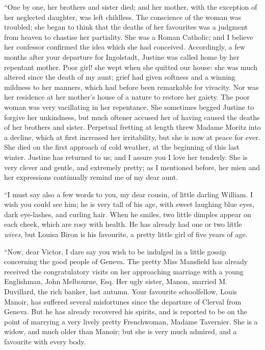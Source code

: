 ``One by one, her brothers and sister
died; and her mother, with the exception
of her neglected daughter, was left
childless. The conscience of the woman
was troubled; she began to think
that the deaths of her favourites was a
judgment from heaven to chastise her
partiality. She was a Roman Catholic;
and I believe her confessor confirmed
the idea which she had conceived. Accordingly,
a few months after your
departure for Ingolstadt, Justine was
called home by her repentant mother.
Poor girl! she wept when she quitted
our house: she was much altered since
the death of my aunt; grief had given
softness and a winning mildness to her
manners, which had before been remarkable
for vivacity. Nor was her
residence at her mother's house of a
nature to restore her gaiety. The poor
woman was very vacillating in her repentance.
She sometimes begged Justine
to forgive her unkindness, but
much oftener accused her of having
caused the deaths of her brothers and
sister. Perpetual fretting at length
threw Madame Moritz into a decline,
which at first increased her irritability,
but she is now at peace for ever. She
died on the first approach of cold weather,
at the beginning of this last winter.
Justine has returned to us; and I
assure you I love her tenderly. She is
very clever and gentle, and extremely
pretty; as I mentioned before, her mien
and her expressions continually remind
me of my dear aunt.

``I must say also a few words to you,
my dear cousin, of little darling William.
I wish you could see him; he is
very tall of his age, with sweet laughing
blue eyes, dark eye-lashes, and curling
hair. When he smiles, two little dimples
appear on each cheek, which are
rosy with health. He has already had
one or two little \emph{wives}, but Louisa Biron
is his favourite, a pretty little girl of
five years of age.

``Now, dear Victor, I dare say you
wish to be indulged in a little gossip
concerning the good people of Geneva.
The pretty Miss Mansfield has already
received the congratulatory visits on
her approaching marriage with a young
Englishman, John Melbourne, Esq.
Her ugly sister, Manon, married M.~%
Duvillard, the rich banker, last autumn.
Your favourite schoolfellow,
Louis Manoir, has suffered several
misfortunes since the departure of Clerval
from Geneva. But he has already recovered
his spirits, and is reported to
be on the point of marrying a very
lively pretty Frenchwoman, Madame
Tavernier. She is a widow, and much
older than Manoir; but she is very
much admired, and a favourite with
every body.

